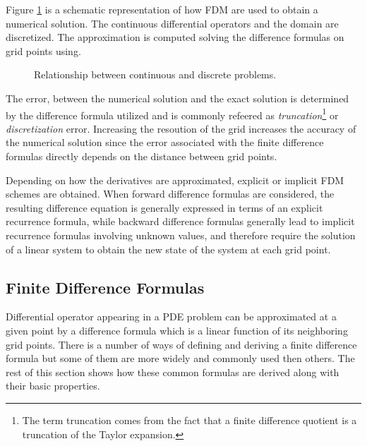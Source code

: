 Figure \ref{fig:schematic_repr_fdm} is a schematic representation of how FDM are used to obtain a numerical solution. The continuous differential operators and the domain are discretized. The approximation is computed solving the difference formulas on grid points using.

   

\begin{figure}[b]
    \centering
    \caption{Relationship between continuous and discrete problems.}
    \label{fig:schematic_repr_fdm}
\end{figure}
    
    The error, between the numerical solution and the exact solution is determined by the difference formula utilized and is commonly refeered as \textit{truncation}\footnote{The term truncation comes from the fact that a finite difference quotient is a truncation of the Taylor expansion.} or \textit{discretization} error.  Increasing the resoution of the grid increases the accuracy of the numerical solution since the error associated with the finite difference formulas directly depends on the distance between grid points.
    
        
    Depending on how the derivatives are approximated, explicit or implicit FDM schemes are
    obtained. When forward difference formulas are considered, the
    resulting difference equation is generally expressed in terms of
    an explicit recurrence formula, while backward difference formulas
    generally lead to implicit recurrence formulas involving unknown
    values, and therefore require the solution of a linear system to
    obtain the new state of the system at each grid point.
    
    
\subsection{Finite Difference Formulas}
Differential operator appearing in a PDE problem can be approximated at a given point by a difference formula which is a linear function of its neighboring grid points. There is a number of ways of defining and deriving a finite difference formula but some of them are more widely and commonly used then others. The rest of this section shows how  these common formulas are derived along with their basic properties. 

